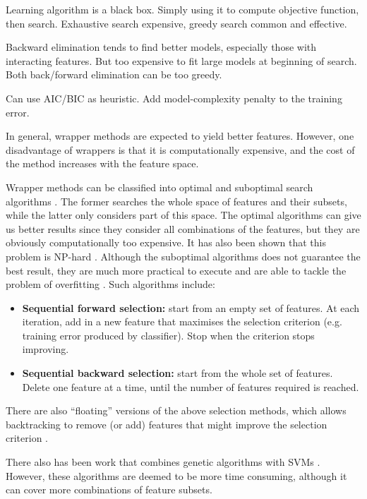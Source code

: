 \documentclass[12pt, twoside, a4paper]{report}
\begin{document}

Learning algorithm is a black box. Simply using it to compute objective function, then search. Exhaustive search expensive, greedy search common and effective.

Backward elimination tends to find better models, especially those with interacting features. But too expensive to fit large models at beginning of search. Both back/forward elimination can be too greedy.

Can use AIC/BIC as heuristic. Add model-complexity penalty to the training error.


In general, wrapper methods are expected to yield better features. However, one disadvantage of wrappers is that it is computationally expensive, and the cost of the method increases with the feature space.

Wrapper methods can be classified into optimal and suboptimal search algorithms \cite{RefWorks:120}. The former searches the whole space of features and their subsets, while the latter only considers part of this space. The optimal algorithms can give us better results since they consider all combinations of the features, but they are obviously computationally too expensive. It has also been shown that this problem is NP-hard \cite{RefWorks:139}. Although the suboptimal algorithms does not guarantee the best result, they are much more practical to execute and are able to tackle the problem of overfitting \cite{RefWorks:140}. Such algorithms include:
\begin{itemize}
\item \textbf{Sequential forward selection:} start from an empty set of features. At each iteration, add in a new feature that maximises the selection criterion (e.g. training error produced by classifier). Stop when the criterion stops improving.
\item \textbf{Sequential backward selection:} start from the whole set of features. Delete one feature at a time, until the number of features required is reached.
\end{itemize}

There are also ``floating'' versions of the above selection methods, which allows backtracking to remove (or add) features that might improve the selection criterion \cite{RefWorks:121}.

There also has been work that combines genetic algorithms with SVMs \cite{RefWorks:120}. However, these algorithms are deemed to be more time consuming, although it can cover more combinations of feature subsets.
\end{document}
